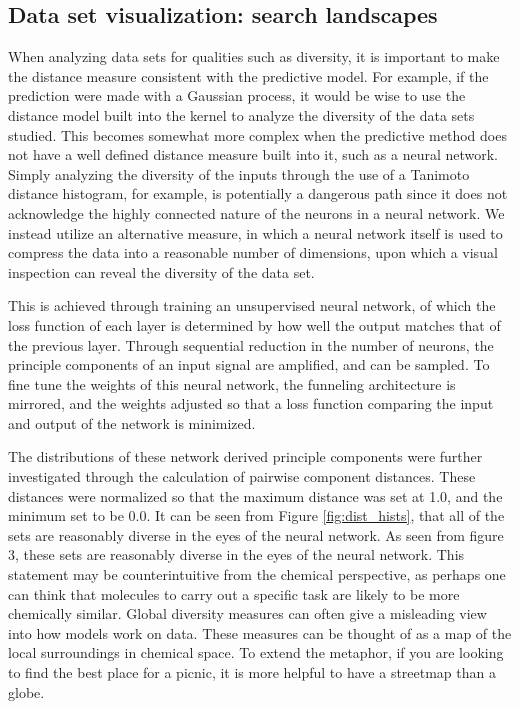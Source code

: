 \subsection{Data set visualization: search landscapes}

When analyzing data sets for qualities such as diversity, it is important to make the distance measure consistent with the predictive model.  For example, if the prediction were made with a Gaussian process, it would be wise to use the distance model built into the kernel to analyze the diversity of the data sets studied.  This becomes somewhat more complex when the predictive method does not have a well defined distance measure built into it, such as a neural network.  Simply analyzing the diversity of the inputs through the use of a Tanimoto distance histogram, for example, is potentially a dangerous path since it does not acknowledge the highly connected nature of the neurons in a neural network.  We instead utilize an alternative measure, in which a neural network itself is used to compress the data into a reasonable number of dimensions, \cite{Hinton_2006} upon which a visual inspection can reveal the diversity of the data set.

This is achieved through training an unsupervised neural network, of which the loss function of each layer is determined by how well the output matches that of the previous layer.  Through sequential reduction in the number of neurons, the principle components of an input signal are amplified, and can be sampled.  To fine tune the weights of this neural network, the funneling architecture is mirrored, and the weights adjusted so that a loss function comparing the input and output of the network is minimized.

The distributions of these network derived principle components were further investigated through the calculation of pairwise component distances. These distances were normalized so that the maximum distance was set at 1.0, and the minimum set to be 0.0. It can be seen from Figure \ref{fig:dist_hists}, that all of the sets are reasonably diverse in the eyes of the neural network.  As seen from figure 3, these sets are reasonably diverse in the eyes of the neural network. This statement may be counterintuitive from the chemical perspective, as perhaps one can think that molecules to carry out a specific task are likely to be more chemically similar. Global diversity measures can often give a misleading view into how models work on data. These measures can be thought of as a map of the local surroundings in chemical space.  To extend the metaphor, if you are looking to find the best place for a picnic, it is more helpful to have a streetmap than a globe.